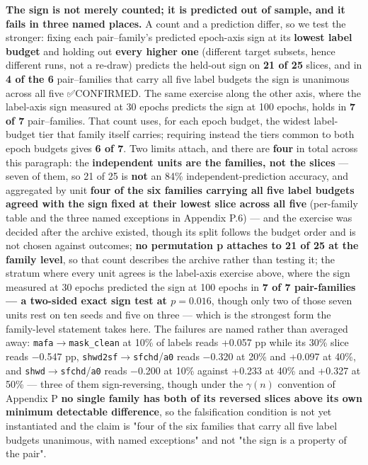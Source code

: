 \documentclass[pdflatex,sn-mathphys-ay]{sn-jnl}
\begin{document}
\textbf{The sign is not merely counted; it is predicted out of sample, and it fails in three named places.} A count and a prediction differ, so we test the stronger: fixing each pair--family's predicted epoch-axis sign at its \textbf{lowest label budget} and holding out \textbf{every higher one} (different target subsets, hence different runs, not a re-draw) predicts the held-out sign on \textbf{21 of 25} slices, and in \textbf{4 of the 6} pair--families that carry all five label budgets the sign is unanimous across all five ✅CONFIRMED. The same exercise along the other axis, where the label-axis sign measured at 30 epochs predicts the sign at 100 epochs, holds in \textbf{7 of 7} pair--families. That count uses, for each epoch budget, the widest label-budget tier that family itself carries; requiring instead the tiers common to both epoch budgets gives \textbf{6 of 7}. Two limits attach, and there are \textbf{four} in total across this paragraph: the \textbf{independent units are the families, not the slices} --- seven of them, so 21 of 25 is \textbf{not} an 84\% independent-prediction accuracy, and aggregated by unit \textbf{four of the six families carrying all five label budgets agreed with the sign fixed at their lowest slice across all five} (per-family table and the three named exceptions in Appendix P.6) --- and the exercise was decided after the archive existed, though its split follows the budget order and is not chosen against outcomes; \textbf{no permutation p attaches to 21 of 25 at the family level}, so that count describes the archive rather than testing it; the stratum where every unit agrees is the label-axis exercise above, where the sign measured at 30 epochs predicted the sign at 100 epochs in \textbf{7 of 7 pair-families --- a two-sided exact sign test at $p = 0.016$}, though only two of those seven units rest on ten seeds and five on three --- which is the strongest form the family-level statement takes here. The failures are named rather than averaged away: \texttt{mafa\ensuremath{\rightarrow}mask\_clean} at 10\% of labels reads +0.057 pp while its 30\% slice reads \ensuremath{-}0.547 pp, \texttt{shwd2sf\ensuremath{\rightarrow}sfchd}/\texttt{a0} reads \ensuremath{-}0.320 at 20\% and +0.097 at 40\%, and \texttt{shwd\ensuremath{\rightarrow}sfchd}/\texttt{a0} reads \ensuremath{-}0.200 at 10\% against +0.233 at 40\% and +0.327 at 50\% --- three of them sign-reversing, though under the $\gamma(n)$ convention of Appendix P \textbf{no single family has both of its reversed slices above its own minimum detectable difference}, so the falsification condition is not yet instantiated and the claim is "four of the six families that carry all five label budgets unanimous, with named exceptions" and not "the sign is a property of the pair".
\end{document}
